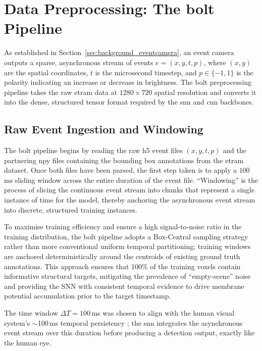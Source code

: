 \section{Data Preprocessing: The \gls{bolt} Pipeline}
\label{sec:data_preprocessing}

As established in Section~\ref{sec:background_eventcamera}, an event camera outputs a sparse, asynchronous stream of events $e = (x, y, t, p)$, where $(x, y)$ are the spatial coordinates, $t$ is the microsecond timestep, and $p \in \{-1, 1\}$ is the polarity indicating an increase or decrease in brightness.
The \gls{bolt} preprocessing pipeline takes the raw \gls{etram} data at $1280 \times 720$ spatial resolution and converts it into the dense, structured tensor format required by the \gls{snn} and \gls{cnn} backbones.

\subsection{Raw Event Ingestion and Windowing}

The \gls{bolt} pipeline begins by reading the raw h5 event files $(x, y, t, p)$ and the partnering npy files containing the bounding box annotations from the \gls{etram} dataset.
Once both files have been parsed, the first step taken is to apply a $100$\,ms sliding window across the entire duration of the event file. 
``Windowing'' is the process of slicing the continuous event stream into chunks that represent a single instance of time for the model, thereby anchoring the asynchronous event stream into discrete, structured training instances. 

To maximise training efficiency and ensure a high signal-to-noise ratio in the training distribution, the \gls{bolt} pipeline adopts a Box-Central sampling strategy rather than more conventional uniform temporal partitioning;
training windows are anchored deterministically around the centroids of existing ground truth annotations. 
This approach ensures that 100\% of the training voxels contain informative structural targets, mitigating the prevalence of ``empty-scene'' noise and providing the SNN with consistent temporal evidence to drive membrane potential
accumulation prior to the target timestamp.

The time window $\Delta T = 100$\,ms was chosen to align with the human visual system's $\sim$100\,ms temporal persistency \cite{deodato2024continuous}; the \gls{snn} integrates the asynchronous event stream over this duration before producing a detection output, exactly like the human eye.

